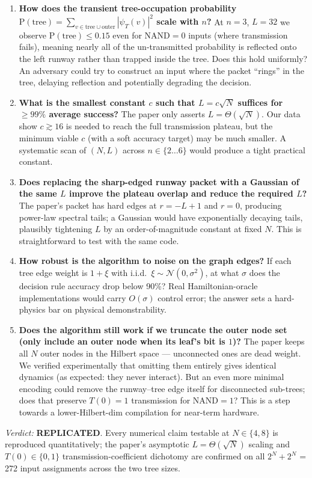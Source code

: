 \documentclass[11pt]{article}
\begin{document}
\begin{enumerate}
\item[Q1] \textbf{How does the transient tree-occupation probability
$\mathrm P(\text{tree}) = \sum_{v\in\text{tree}\cup\text{outer}} |\psi_T(v)|^{2}$
scale with $n$?} At $n=3$, $L=32$ we observe $\mathrm P(\text{tree}) \le 0.15$
even for NAND$=0$ inputs (where transmission fails), meaning nearly all of the
un-transmitted probability is reflected onto the left runway rather than
trapped inside the tree. Does this hold uniformly? An adversary could try to
construct an input where the packet ``rings'' in the tree, delaying reflection
and potentially degrading the decision.

\item[Q2] \textbf{What is the smallest constant $c$ such that
$L = c\sqrt N$ suffices for $\ge 99\%$ average success?} The paper only asserts
$L=\Theta(\sqrt N)$. Our data show $c \gtrsim 16$ is needed to reach the full
transmission plateau, but the minimum viable $c$ (with a soft accuracy target)
may be much smaller. A systematic scan of $(N, L)$ across $n\in\{2\ldots 6\}$
would produce a tight practical constant.

\item[Q3] \textbf{Does replacing the sharp-edged runway packet with a Gaussian
of the same $L$ improve the plateau overlap and reduce the required $L$?}
The paper's packet has hard edges at $r=-L{+}1$ and $r=0$, producing power-law
spectral tails; a Gaussian would have exponentially decaying tails, plausibly
tightening $L$ by an order-of-magnitude constant at fixed $N$. This is
straightforward to test with the same code.

\item[Q4] \textbf{How robust is the algorithm to noise on the graph
edges?} If each tree edge weight is $1 + \xi$ with i.i.d.\ $\xi\sim
\mathcal N(0,\sigma^2)$, at what $\sigma$ does the decision rule accuracy
drop below 90\%? Real Hamiltonian-oracle implementations would carry $O(\sigma)$
control error; the answer sets a hard-physics bar on physical demonstrability.

\item[Q5] \textbf{Does the algorithm still work if we truncate the outer
node set (only include an outer node when its leaf's bit is $1$)?} The paper
keeps all $N$ outer nodes in the Hilbert space --- unconnected ones are dead
weight. We verified experimentally that omitting them entirely gives
identical dynamics (as expected: they never interact). But an even more
minimal encoding could remove the runway--tree edge itself for disconnected
sub-trees; does that preserve $T(0)=1$ transmission for NAND$=1$? This is a
step towards a lower-Hilbert-dim compilation for near-term hardware.
\end{enumerate}

\bigskip
\noindent\emph{Verdict:} \textbf{REPLICATED}.
Every numerical claim testable at $N\in\{4,8\}$ is reproduced quantitatively;
the paper's asymptotic $L=\Theta(\sqrt N)$ scaling and $T(0)\in\{0,1\}$
transmission-coefficient dichotomy are confirmed on all $2^N + 2^N$ = 272
input assignments across the two tree sizes.
\end{document}
